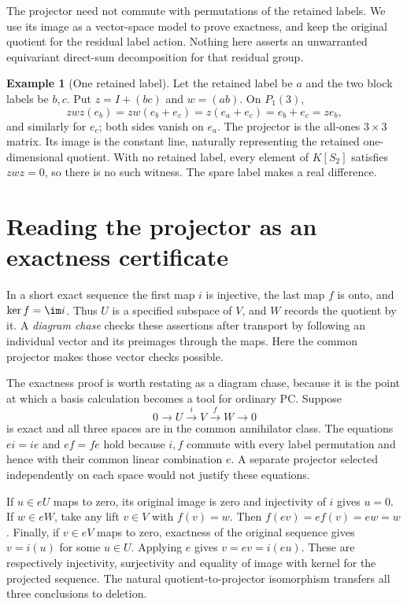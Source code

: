 \documentclass[11pt,a4paper,oneside,openany]{book}
\theoremstyle{definition}\newtheorem{definition}[theorem]{Definition}
\newtheorem{example}[theorem]{Example}
\theoremstyle{remark}\newtheorem{remark}[theorem]{Remark}
\numberwithin{equation}{chapter}
\begin{document}
The projector need not commute with permutations of the retained labels. We use its image as a vector-space model to prove exactness, and keep the original quotient for the residual label action. Nothing here asserts an unwarranted equivariant direct-sum decomposition for that residual group.

\begin{example}[One retained label]
Let the retained label be $a$ and the two block labels be $b,c$. Put $z=I+(bc)$ and $w=(ab)$. On $P_1(3)$,
\[zwz(e_b)=zw(e_b+e_c)=z(e_a+e_c)=e_b+e_c=ze_b,\]
and similarly for $e_c$; both sides vanish on $e_a$. The projector is the all-ones $3\times3$ matrix. Its image is the constant line, naturally representing the retained one-dimensional quotient. With no retained label, every element of $K[S_2]$ satisfies $zwz=0$, so there is no such witness. The spare label makes a real difference.
\end{example}


\section{Reading the projector as an exactness certificate}
In a short exact sequence the first map $i$ is injective, the last
map $f$ is onto, and $\ker f=\im i$. Thus $U$ is a specified
subspace of $V$, and $W$ records the quotient by it. A
\emph{diagram chase} checks these assertions after transport by
following an individual vector and its preimages through the maps.
Here the common projector makes those vector checks possible.

The exactness proof is worth restating as a diagram chase, because
it is the point at which a basis calculation becomes a tool for
ordinary PC. Suppose
\[
 0\longrightarrow U\xrightarrow{i}V\xrightarrow{f}W\longrightarrow0
\]
is exact and all three spaces are in the common annihilator class.
The equations $ei=ie$ and $ef=fe$ hold because $i,f$ commute with
every label permutation and hence with their common linear combination
$e$. A separate projector selected independently on each space would
not justify these equations.

If $u\in eU$ maps to zero, its original image is zero and injectivity
of $i$ gives $u=0$. If $w\in eW$, take any lift $v\in V$ with
$f(v)=w$. Then $f(ev)=e f(v)=ew=w$. Finally, if $v\in eV$ maps
to zero, exactness of the original sequence gives $v=i(u)$ for some
$u\in U$. Applying $e$ gives $v=ev=i(eu)$. These are respectively
injectivity, surjectivity and equality of image with kernel for the
projected sequence. The natural quotient-to-projector isomorphism
transfers all three conclusions to deletion.
\end{document}

